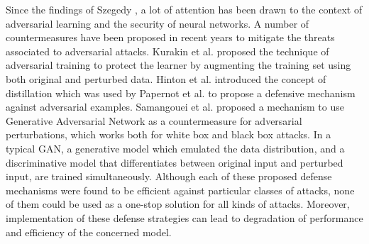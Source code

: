 Since the findings of Szegedy \cite{Szegedy13}, a lot of attention has been drawn to the context of adversarial learning and the security of neural networks. A number of countermeasures have been proposed in recent years to mitigate the threats associated to adversarial attacks. Kurakin et al. \cite{KurakinGB16} proposed the technique of adversarial training to protect the learner by augmenting the training set using both original and perturbed data. Hinton et al. \cite{HintonVD15} introduced the concept of distillation which was used by Papernot et al. \cite{PapernotMWJS16} to propose a defensive mechanism against adversarial examples. Samangouei et al. \cite{SamangoueiKC18} proposed a mechanism to use Generative Adversarial Network as a countermeasure for adversarial perturbations, which works both for white box and black box attacks. In a typical GAN, a generative model which emulated the data distribution, and a discriminative model that differentiates between original input and perturbed input, are trained simultaneously. Although each of these proposed defense mechanisms were found to be efficient against particular classes of attacks, none of them could be used as a one-stop solution for all kinds of attacks. Moreover, implementation of these defense strategies can lead to degradation of performance and efficiency of the concerned model.